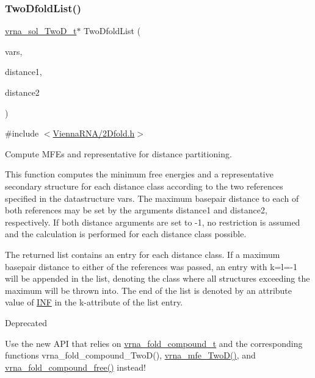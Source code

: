 \subsubsection{\texorpdfstring{Two\+Dfold\+List()}{TwoDfoldList()}}
{\footnotesize\ttfamily \hyperlink{group__kl__neighborhood__mfe_structvrna__sol__TwoD__t}{vrna\+\_\+sol\+\_\+\+Two\+D\+\_\+t}$\ast$ Two\+Dfold\+List (\begin{DoxyParamCaption}\item[{\hyperlink{group__kl__neighborhood__mfe_structTwoDfold__vars}{Two\+Dfold\+\_\+vars} $\ast$}]{vars,  }\item[{int}]{distance1,  }\item[{int}]{distance2 }\end{DoxyParamCaption})}



{\ttfamily \#include $<$\hyperlink{2Dfold_8h}{Vienna\+R\+N\+A/2\+Dfold.\+h}$>$}



Compute M\+FE\textquotesingle{}s and representative for distance partitioning. 

This function computes the minimum free energies and a representative secondary structure for each distance class according to the two references specified in the datastructure \textquotesingle{}vars\textquotesingle{}. The maximum basepair distance to each of both references may be set by the arguments \textquotesingle{}distance1\textquotesingle{} and \textquotesingle{}distance2\textquotesingle{}, respectively. If both distance arguments are set to \textquotesingle{}-\/1\textquotesingle{}, no restriction is assumed and the calculation is performed for each distance class possible.

The returned list contains an entry for each distance class. If a maximum basepair distance to either of the references was passed, an entry with k=l=-\/1 will be appended in the list, denoting the class where all structures exceeding the maximum will be thrown into. The end of the list is denoted by an attribute value of \hyperlink{energy__const_8h_a12c2040f25d8e3a7b9e1c2024c618cb6}{I\+NF} in the k-\/attribute of the list entry.

\begin{DoxyRefDesc}{Deprecated}
\item[\hyperlink{deprecated__deprecated000004}{Deprecated}]Use the new A\+PI that relies on \hyperlink{group__fold__compound_ga1b0cef17fd40466cef5968eaeeff6166}{vrna\+\_\+fold\+\_\+compound\+\_\+t} and the corresponding functions vrna\+\_\+fold\+\_\+compound\+\_\+\+Two\+D(), \hyperlink{group__kl__neighborhood__mfe_ga243c288b463147352829df04de6a2f77}{vrna\+\_\+mfe\+\_\+\+Two\+D()}, and \hyperlink{group__fold__compound_gadded6039d63f5d6509836e20321534ad}{vrna\+\_\+fold\+\_\+compound\+\_\+free()} instead!\end{DoxyRefDesc}



